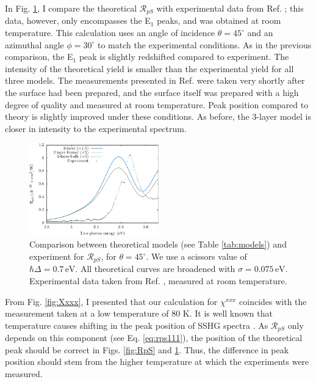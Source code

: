 In Fig. \ref{fig:mitchellRpS}, I compare the theoretical $\mathcal{R}_{pS}$ with
experimental data from Ref. \cite{mitchellSS01}; this data, however, only
encompasses the E$_{1}$ peaks, and was obtained at room temperature. This
calculation uses an angle of incidence $\theta=45^\circ$ and an azimuthal angle
$\phi=30^\circ$ to match the experimental conditions. As in the previous
comparison, the E$_{1}$ peak is slightly redshifted compared to experiment. The
intensity of the theoretical yield is smaller than the experimental yield for
all three models. The measurements presented in Ref. \cite{mitchellSS01} were
taken very shortly after the surface had been prepared, and the surface itself
was prepared with a high degree of quality and measured at room temperature.
Peak position compared to theory is slightly improved under these conditions. As
before, the 3-layer model is closer in intensity to the experimental spectrum.

\begin{figure}[H]
\centering
\includegraphics[width=0.5\textwidth]{content/figures/fig-Si1x1-Mitchell_RpS}
\caption{Comparison between theoretical models (see Table
\ref{tab:models}) and experiment for $\mathcal{R}_{pS}$, for $\theta=45^\circ$.
We use a scissors value of $\hbar\Delta = 0.7\,\text{eV}$. All theoretical
curves are broadened with $\sigma=0.075\,\text{eV}$. Experimental data taken
from Ref. \cite{mitchellSS01}, measured at room temperature.}
\label{fig:mitchellRpS}
\end{figure}

From Fig. \ref{fig:Xxxx}, I presented that our calculation for
$\chi^{xxx}$ coincides with the measurement taken at a
low temperature of 80 K. It is well known that temperature causes shifting in
the peak position of SSHG spectra \cite{dadapPRB97}. As $\mathcal{R}_{pS}$ only
depends on this component (see Eq. \eqref{eq:rps111}), the position of the
theoretical peak should be correct in Figs. \ref{fig:RpS} and
\ref{fig:mitchellRpS}. Thus, the difference in peak position should stem from
the higher temperature at which the experiments were measured.

